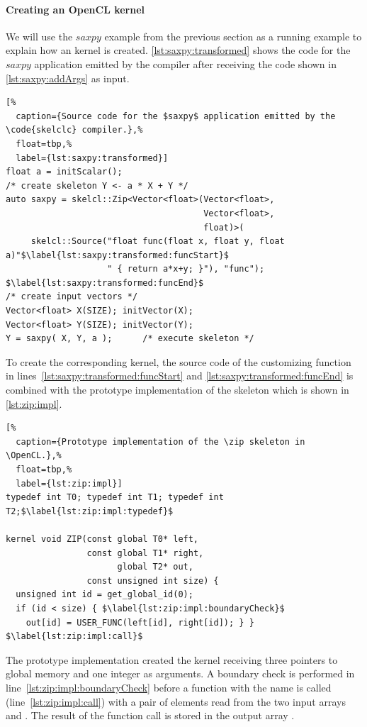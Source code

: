\paragraph{Creating an OpenCL kernel}
We will use the $saxpy$ example from the previous section as a running example to explain how an \OpenCL kernel is created.
\autoref{lst:saxpy:transformed} shows the code for the $saxpy$ application emitted by the  compiler after receiving the code shown in \autoref{lst:saxpy:addArgs} as input.
\begin{lstlisting}[%
  caption={Source code for the $saxpy$ application emitted by the \code{skelclc} compiler.},%
  float=tbp,%
  label={lst:saxpy:transformed}]
float a = initScalar();
/* create skeleton Y <- a * X + Y */
auto saxpy = skelcl::Zip<Vector<float>(Vector<float>,
                                       Vector<float>,
                                       float)>(
     skelcl::Source("float func(float x, float y, float a)"$\label{lst:saxpy:transformed:funcStart}$
                    " { return a*x+y; }"), "func"); $\label{lst:saxpy:transformed:funcEnd}$
/* create input vectors */
Vector<float> X(SIZE); initVector(X);
Vector<float> Y(SIZE); initVector(Y);
Y = saxpy( X, Y, a );      /* execute skeleton */
\end{lstlisting}

To create the corresponding \OpenCL kernel, the source code of the customizing function in lines~\ref{lst:saxpy:transformed:funcStart} and \ref{lst:saxpy:transformed:funcEnd} is combined with the prototype implementation of the \zip skeleton which is shown in \autoref{lst:zip:impl}.
%
\begin{lstlisting}[%
  caption={Prototype implementation of the \zip skeleton in \OpenCL.},%
  float=tbp,%
  label={lst:zip:impl}]
typedef int T0; typedef int T1; typedef int T2;$\label{lst:zip:impl:typedef}$

kernel void ZIP(const global T0* left,
                const global T1* right,
                      global T2* out,
                const unsigned int size) {
  unsigned int id = get_global_id(0);
  if (id < size) { $\label{lst:zip:impl:boundaryCheck}$
    out[id] = USER_FUNC(left[id], right[id]); } }  $\label{lst:zip:impl:call}$
\end{lstlisting}
%
The prototype implementation created the \OpenCL kernel  receiving three pointers to global memory and one integer as arguments.
A boundary check is performed in line~\ref{lst:zip:impl:boundaryCheck} before a function with the name  is called (line~\ref{lst:zip:impl:call}) with a pair of elements read from the two input arrays  and .
The result of the function call is stored in the output array .

